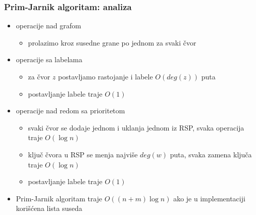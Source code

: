 \documentclass[compress]{beamer}
\begin{document}
\begin{frame}[fragile]
  \frametitle{Prim-Jarnik algoritam: analiza}
  \begin{itemize}
    \item operacije nad grafom
    \begin{itemize}
      \item prolazimo kroz susedne grane po jednom za svaki čvor
    \end{itemize}
    \item operacije sa labelama
    \begin{itemize}
      \item za čvor $z$ postavljamo rastojanje i labele $O(deg(z))$ puta
      \item postavljanje labele traje $O(1)$
    \end{itemize}
    \item operacije nad redom sa prioritetom
    \begin{itemize}
      \item svaki čvor se dodaje jednom i uklanja jednom iz RSP, svaka 
        operacija traje $O(\log n)$
      \item ključ čvora u RSP se menja najviše $deg(w)$ puta, svaka 
        zamena ključa traje $O(\log n)$
      \item postavljanje labele traje $O(1)$
    \end{itemize}
    \item Prim-Jarnik algoritam traje $O((n+m)\log n)$ ako je u 
      implementaciji korišćena lista suseda
  \end{itemize}
\end{frame}
\end{document}
